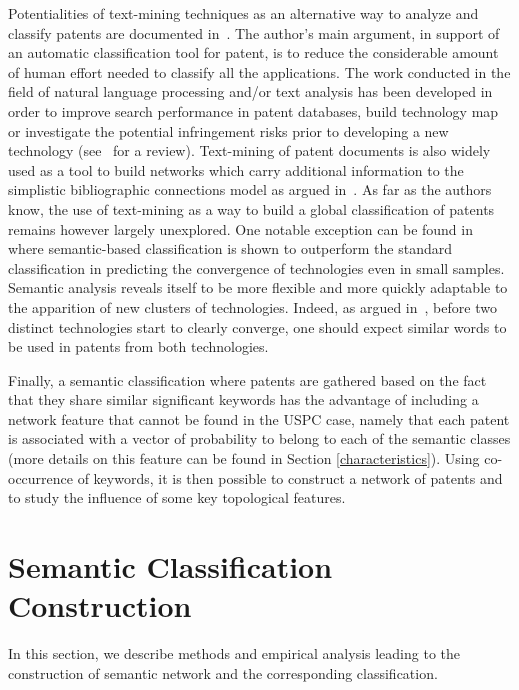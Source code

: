 \documentclass[12pt,twoside,a4paper]{article}
\begin{document}
Potentialities of text-mining techniques as an alternative way to analyze and classify patents are documented in~\cite{tseng2007text}. The author's main argument, in support of an automatic classification tool for patent, is to reduce the considerable amount of human effort needed to classify all the applications. The work conducted in the field of natural language processing and/or text analysis has been developed in order to improve search performance in patent databases, build technology map or investigate the potential infringement risks prior to developing a new technology (see~\cite{abbas2014literature} for a review). Text-mining of patent documents is also widely used as a tool to build networks which carry additional information to the simplistic bibliographic connections model as argued in~\cite{yoon2004text}. As far as the authors know, the use of text-mining as a way to build a global classification of patents remains however largely unexplored. One notable exception can be found in~\cite{preschitschek2013} where semantic-based classification is shown to outperform the standard classification in predicting the convergence of technologies even in small samples. Semantic analysis reveals itself to be more flexible and more quickly adaptable to the apparition of new clusters of technologies. Indeed, as argued in~\cite{preschitschek2013}, before two distinct technologies start to clearly converge, one should expect similar words to be used in patents from both technologies.

Finally, a semantic classification where patents are gathered based on the fact that they share similar significant keywords has the advantage of including a network feature that cannot be found in the USPC case, namely that each patent is associated with a vector of probability to belong to each of the semantic classes (more details on this feature can be found in Section \ref{characteristics}). Using co-occurrence of keywords, it is then possible to construct a network of patents and to study the influence of some key topological features.

\section{Semantic Classification Construction \label{keywords}}

In this section, we describe methods and empirical analysis leading to the construction of semantic network and the corresponding classification. 
\end{document}
